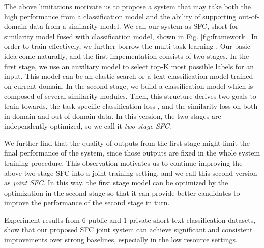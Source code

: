 The  above  limitations motivate us to propose a system that may take both the high performance from a classification model and the ability of supporting out-of-domain data from a similarity model.
We call our system as SFC,  short  for  similarity model fused with classification model, shown in Fig.  \ref{fig:framework}.  
In order to train effectively, we further borrow the multi-task learning   \cite{caruana1993multitask,collobert2008unified,  liu2019multi}.
Our basic  idea  come naturally, and the first impementation consists of two stages. 
In the first stage, we use an auxiliary model to  select  top-K most possible labels for an input. 
This model can be an elastic search  \cite{divya2013elasticsearch}  or a text classification model trained on current domain.  
In  the  second  stage,  we  build  a classification  model  which is composed of several similarity  modules. 
Then, this structure  derives  two  goals to train towards, the task-specific classification loss ,  and  the similarity loss on both in-domain and out-of-domain data. 
In this version, the two stages are  independently optimized, so we call it \emph{two-stage SFC}. 

We further find that the  quality of outputs from the first stage might limit the final performance of the system,  since  those outputs are fixed in the whole system training  procedure.  
This  observation motivates us to continue improving  the  above two-stage  SFC  into a joint training setting, and we call this second version as \emph{joint SFC}. 
In this  way, the first stage model can be optimized by the optimization in the second stage so that it can provide better candidates to improve the performance of the second stage in turn.

Experiment  results  from  6  public  and  1  private  short-text classification datasets,  show  that  our proposed SFC joint system can achieve significant and consistent  improvements  over  strong baselines, especially in the low resource settings.

